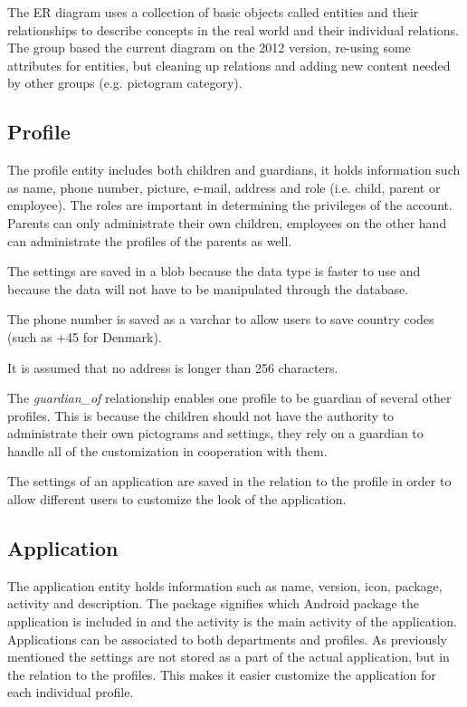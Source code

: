 The ER diagram uses a collection of basic objects called entities and their relationships to describe concepts in the real world and their individual relations. The group based the current diagram on the 2012 version, re-using some attributes for entities, but cleaning up relations and adding new content needed by other groups (e.g. pictogram category). 

\subsection{Profile}
The profile entity includes both children and guardians, it holds information such as name, phone number, picture, e-mail, address and role (i.e. child, parent or employee). The roles are important in determining the privileges of the account. Parents can only administrate their own children, employees on the other hand can administrate the profiles of the parents as well. 

The settings are saved in a blob because the data type is faster to use and because the data will not have to be manipulated through the database.

The phone number is saved as a varchar to allow users to save country codes (such as +45 for Denmark). 

It is assumed that no address is longer than 256 characters.

The \emph{guardian\_of} relationship enables one profile to be guardian of several other profiles. This is because the children should not have the authority to administrate their own pictograms and settings, they rely on a guardian to handle all of the customization in cooperation with them. 

The settings of an application are saved in the relation to the profile in order to allow different users to customize the look of the application.

\subsection{Application}
The application entity holds information such as name, version, icon, package, activity and description. 
The package signifies which Android package the application is included in and the activity is the main activity of the application. Applications can be associated to both departments and profiles. As previously mentioned the settings are not stored as a part of the actual application, but in the relation to the profiles. This makes it easier customize the application for each individual profile.
 
